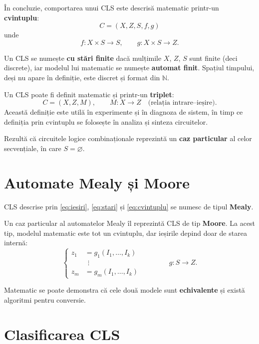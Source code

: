 În concluzie, comportarea unui CLS este descrisă matematic printr-un
\textbf{cvintuplu}:
\begin{equation}\label{eq:cvintuplu}
  C = (X, Z, S, f, g)
\end{equation}
unde
\[
  f : X \times S \to S, \qquad g : X \times S \to Z .
\]

Un CLS se numește \textbf{cu stări finite} dacă mulțimile $X$, $Z$, $S$ sunt
finite (deci discrete), iar modelul lui matematic se numește
\textbf{automat finit}. Spațiul timpului, deși nu apare în definiție, este
discret și format din $\mathbb{N}$.

Un CLS poate fi definit matematic și printr-un \textbf{triplet}:
\begin{equation}\label{eq:triplet}
  C = (X, Z, M), \qquad M : X \to Z \quad \text{(relația intrare--ieșire)}.
\end{equation}
Această definiție este utilă în experimente și în diagnoza de sistem, în timp ce
definiția prin cvintuplu se folosește în analiza și sinteza circuitelor.

\begin{retine}
Rezultă că circuitele logice combinaționale reprezintă un \textbf{caz particular}
al celor secvențiale, în care $S = \varnothing$.
\end{retine}

\section{Automate Mealy și Moore}

CLS descrise prin \eqref{eq:iesiri}, \eqref{eq:stari} și \eqref{eq:cvintuplu}
se numesc de tipul \textbf{Mealy}.

Un caz particular al automatelor Mealy îl reprezintă CLS de tip
\textbf{Moore}. La acest tip, modelul matematic este tot un cvintuplu, dar
ieșirile depind doar de starea internă:
\begin{equation}\label{eq:moore}
\left\{
\begin{aligned}
  z_1 &= g_1(I_1, \dots, I_k)\\
      &\ \ \vdots\\
  z_m &= g_m(I_1, \dots, I_k)
\end{aligned}
\right.
\qquad\qquad g : S \to Z .
\end{equation}

Matematic se poate demonstra că cele două modele sunt \textbf{echivalente} și
există algoritmi pentru conversie.

\section{Clasificarea CLS}

